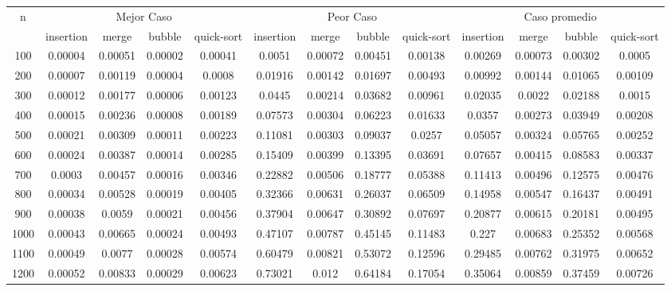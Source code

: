 \documentclass[conference]{IEEEtran}
\begin{document}
\begin{table}[!ht]
\begin{tabular}{|c|c|c|c|c|c|c|c|c|c|c|c|c|}
\hline
\multirow{2}{*}{n} & \multicolumn{4}{c|}{Mejor Caso} & \multicolumn{4}{c|}{Peor Caso} & \multicolumn{4}{c|}{Caso promedio} \\ 
\cline{2-13}
& insertion & merge & bubble & quick-sort & insertion & merge & bubble & quick-sort & insertion & merge & bubble & quick-sort \\ 
\hline
100 & 0.00004 & 0.00051 & 0.00002 & 0.00041 & 0.0051 & 0.00072 & 0.00451 & 0.00138 &0.00269 & 0.00073 & 0.00302 & 0.0005 \\
\hline
200 & 0.00007 & 0.00119 & 0.00004 & 0.0008 & 0.01916 & 0.00142 & 0.01697 & 0.00493 &0.00992 & 0.00144 & 0.01065 & 0.00109 \\
\hline
300 & 0.00012 & 0.00177 & 0.00006 & 0.00123 & 0.0445 & 0.00214 & 0.03682 & 0.00961 &0.02035 & 0.0022 & 0.02188 & 0.0015 \\
\hline
400 & 0.00015 & 0.00236 & 0.00008 & 0.00189 & 0.07573 & 0.00304 & 0.06223 & 0.01633 &0.0357 & 0.00273 & 0.03949 & 0.00208 \\
\hline
500 & 0.00021 & 0.00309 & 0.00011 & 0.00223 & 0.11081 & 0.00303 & 0.09037 & 0.0257 &0.05057 & 0.00324 & 0.05765 & 0.00252 \\
\hline
600 & 0.00024 & 0.00387 & 0.00014 & 0.00285 & 0.15409 & 0.00399 & 0.13395 & 0.03691 &0.07657 & 0.00415 & 0.08583 & 0.00337 \\
\hline
700 & 0.0003 & 0.00457 & 0.00016 & 0.00346 & 0.22882 & 0.00506 & 0.18777 & 0.05388 &0.11413 & 0.00496 & 0.12575 & 0.00476 \\
\hline
800 & 0.00034 & 0.00528 & 0.00019 & 0.00405 & 0.32366 & 0.00631 & 0.26037 & 0.06509 &0.14958 & 0.00547 & 0.16437 & 0.00491 \\
\hline
900 & 0.00038 & 0.0059 & 0.00021 & 0.00456 & 0.37904 & 0.00647 & 0.30892 & 0.07697 &0.20877 & 0.00615 & 0.20181 & 0.00495 \\
\hline
1000 & 0.00043 & 0.00665 & 0.00024 & 0.00493 & 0.47107 & 0.00787 & 0.45145 & 0.11483 &0.227 & 0.00683 & 0.25352 & 0.00568 \\
\hline
1100 & 0.00049 & 0.0077 & 0.00028 & 0.00574 & 0.60479 & 0.00821 & 0.53072 & 0.12596 &0.29485 & 0.00762 & 0.31975 & 0.00652 \\
\hline
1200 & 0.00052 & 0.00833 & 0.00029 & 0.00623 & 0.73021 & 0.012 & 0.64184 & 0.17054 &0.35064 & 0.00859 & 0.37459 & 0.00726 \\

\end{tabular}
\end{table}
\end{document}
